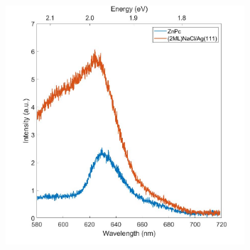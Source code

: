 







\begin{figure} [h]
    \centering
    \includegraphics[width=3.5in]{pictures/znpc_3V_300pA_300s.jpg}
    \caption{}
    \label{fig:opv:znpc-stml}
\end{figure}

